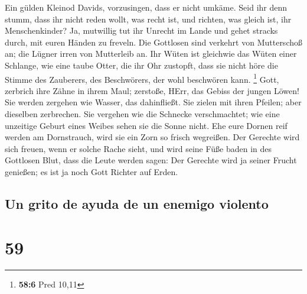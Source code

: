  Ein gülden Kleinod Davids, vorzusingen, dass er nicht
umkäme.  Seid ihr denn stumm, dass ihr nicht reden wollt,
was recht ist, und richten, was gleich ist, ihr Menschenkinder?
 Ja, mutwillig tut ihr Unrecht im Lande und gehet stracks
durch, mit euren Händen zu freveln.  Die Gottlosen sind
verkehrt von Mutterschoß an; die Lügner irren von Mutterleib an.
 Ihr Wüten ist gleichwie das Wüten einer Schlange, wie
eine taube Otter, die ihr Ohr zustopft,  dass sie nicht
höre die Stimme des Zauberers, des Beschwörers, der wohl beschwören
kann. \footnote{\textbf{58:6} Pred 10,11}  Gott, zerbrich
ihre Zähne in ihrem Maul; zerstoße, HErr, das Gebiss der jungen Löwen!
 Sie werden zergehen wie Wasser, das dahinfließt. Sie
zielen mit ihren Pfeilen; aber dieselben zerbrechen.  Sie
vergehen wie die Schnecke verschmachtet; wie eine unzeitige Geburt eines
Weibes sehen sie die Sonne nicht.  Ehe eure Dornen reif
werden am Dornstrauch, wird sie ein Zorn so frisch wegreißen.
 Der Gerechte wird sich freuen, wenn er solche Rache
sieht, und wird seine Füße baden in des Gottlosen Blut, 
dass die Leute werden sagen: Der Gerechte wird ja seiner Frucht
genießen; es ist ja noch Gott Richter auf Erden.

\hypertarget{un-grito-de-ayuda-de-un-enemigo-violento}{%
\subsection{Un grito de ayuda de un enemigo
violento}\label{un-grito-de-ayuda-de-un-enemigo-violento}}

\hypertarget{section-58}{%
\section{59}\label{section-58}}

